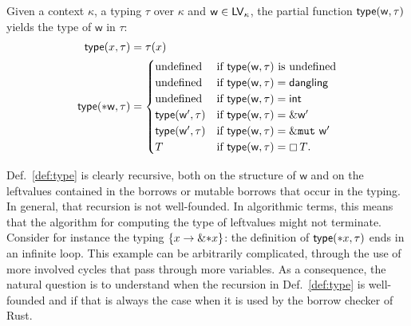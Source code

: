 \begin{definition}\label{def:type}
  Given a context $\kappa$, a typing $\tau$ over $\kappa$
  and $\mathsf{w}\in\mathsf{LV}_\kappa$, the partial function
  $\mathsf{type}(\mathsf{w},\tau)$ yields the type of $\mathsf{w}$ in $\tau$:
  \begin{align*}
    \mathsf{type}(x,\tau)&=\tau(x)\\
    \mathsf{type}(*\mathsf{w},\tau)&=\begin{cases}
    \text{undefined} & \text{if $\mathsf{type}(\mathsf{w},\tau)$ is undefined}\\
    \text{undefined} & \text{if $\mathsf{type}(\mathsf{w},\tau)=\mathsf{dangling}$}\\
    \text{undefined} & \text{if $\mathsf{type}(\mathsf{w},\tau)=\mathsf{int}$}\\
    \mathsf{type}(\mathsf{w}',\tau) & \text{if $\mathsf{type}(\mathsf{w},\tau)=\&\mathsf{w}'$}\\
    \mathsf{type}(\mathsf{w}',\tau) & \text{if $\mathsf{type}(\mathsf{w},\tau)=\&\mathtt{mut}\ \mathsf{w}'$}\\
    T & \text{if $\mathsf{type}(\mathsf{w},\tau)=\boxempty\,{T}$.}
    \end{cases}
  \end{align*}
\end{definition}

Def.~\ref{def:type} is clearly recursive, both on the structure of $\mathsf{w}$ and
on the leftvalues contained in the borrows or mutable borrows that occur in the typing.
In general, that recursion is not well-founded. In algorithmic terms, this means
that the algorithm for computing the type of leftvalues might not terminate.
Consider for instance the typing $\{x\to\&\mathtt{*}x\}$:
the definition of $\mathsf{type}(\mathtt{*}x,\tau)$ ends in an infinite loop.
This example can be arbitrarily complicated, through the
use of more involved cycles that pass through more variables. As a consequence,
the natural question is to understand when the recursion in
Def.~\ref{def:type} is well-founded and if that is always the case when it is
used by the borrow checker of Rust.
